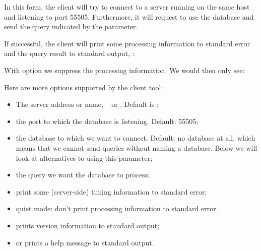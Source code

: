 
In this form, the client will try to connect to a server
running on the same host and listening to port 55505.
Furthermore, it will request to use the database 
and send the query indicated by the  parameter.

\begin{minipage}{\textwidth}
If successful, the client will print some
processing information to standard error and the query result
to standard output, \eg:

\end{minipage}

\begin{minipage}{\textwidth}
With option  we suppress the processing information.
We would then only see:

\end{minipage}

\begin{minipage}{\textwidth}
Here are more options supported by the client tool:
\begin{itemize}
\item {} 
The server address or name, \eg\  or
. Default is ;

\item {}
the port to which the database is listening. Default: 55505;

\item {}
the database to which we want to connect. 
Default: no database at all, which means
that we cannot send queries without naming a database.
Below we will look at alternatives to using this parameter;

\item {}
the query we want the database to process;

\item {}
print some (server-side) timing information to standard error;

\item {}
quiet mode: don't print processing information to standard error.

\item {} prints version information to standard output;
\item {} or  prints a help message to standard output.
\end{itemize}
\end{minipage}

